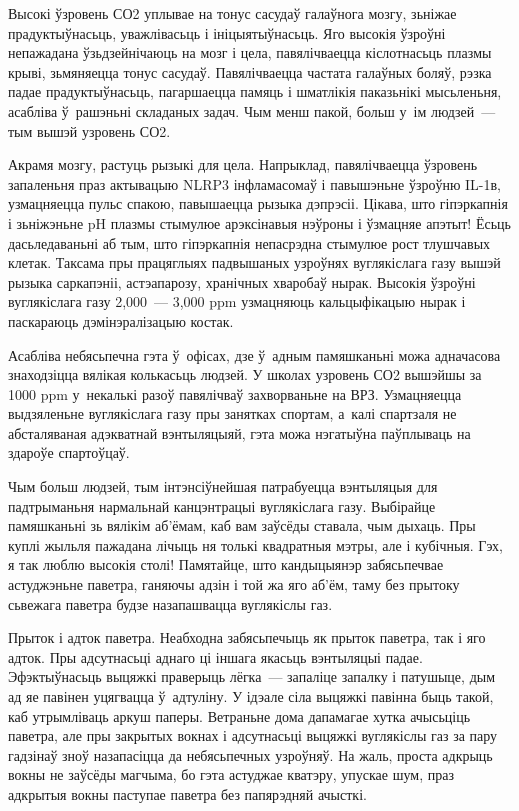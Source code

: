 Высокі ўзровень СО2 уплывае на тонус сасудаў галаўнога мозгу, зьніжае прадуктыўнасьць, уважлівасьць і ініцыятыўнасьць. Яго высокія ўзроўні непажадана ўзьдзейнічаюць на мозг і цела, павялічваецца кіслотнасьць плазмы крыві, зьмяняецца тонус сасудаў. Павялічваецца частата галаўных боляў, рэзка падае прадуктыўнасьць, пагаршаецца памяць і шматлікія паказьнікі мысьленьня, асабліва ў~рашэньні складаных задач. Чым менш пакой, больш у~ім людзей~--- тым вышэй узровень СО2.

Акрамя мозгу, растуць рызыкі для цела. Напрыклад, павялічваецца ўзровень запаленьня праз актывацыю NLRP3 інфламасомаў і павышэньне ўзроўню IL-1в, узмацняецца пульс спакою, павышаецца рызыка дэпрэсіі. Цікава, што гіпэркапнія і зьніжэньне pH плазмы стымулюе арэксінавыя нэўроны і ўзмацняе апэтыт! Ёсьць дасьледаваньні аб тым, што гіпэркапнія непасрэдна стымулюе рост тлушчавых клетак. Таксама пры працяглыях падвышаных узроўнях вуглякіслага газу вышэй рызыка саркапэніі, астэапарозу, хранічных хваробаў нырак. Высокія ўзроўні вуглякіслага газу 2,000~--- 3,000 ppm узмацняюць кальцыфікацыю нырак і паскараюць дэмінэралізацыю костак.

Асабліва небясьпечна гэта ў~офісах, дзе ў~адным памяшканьні можа адначасова знаходзіцца вялікая колькасьць людзей. У школах узровень СО2 вышэйшы за 1000 ppm у~некалькі разоў павялічваў захворваньне на ВРЗ. Узмацняецца выдзяленьне вуглякіслага газу пры занятках спортам, а~калі спартзаля не абсталяваная адэкватнай вэнтыляцыяй, гэта можа нэгатыўна паўплываць на здароўе спартоўцаў.

Чым больш людзей, тым інтэнсіўнейшая патрабуецца вэнтыляцыя для падтрыманьня нармальнай канцэнтрацыі вуглякіслага газу. Выбірайце памяшканьні зь вялікім аб'ёмам, каб вам заўсёды ставала, чым дыхаць. Пры куплі жыльля пажадана лічыць ня толькі квадратныя мэтры, але і кубічныя. Гэх, я так люблю высокія столі! Памятайце, што кандыцыянэр забясьпечвае астуджэньне паветра, ганяючы адзін і той жа яго аб'ём, таму без прытоку сьвежага паветра будзе назапашвацца вуглякіслы газ.

Прыток і адток паветра. Неабходна забясьпечыць як прыток паветра, так і яго адток. Пры адсутнасьці аднаго ці іншага якасьць вэнтыляцыі падае. Эфэктыўнасьць выцяжкі праверыць лёгка~--- запаліце запалку і патушыце, дым ад яе павінен уцягвацца ў~адтуліну. У ідэале сіла выцяжкі павінна быць такой, каб утрымліваць аркуш паперы. Ветраньне дома дапамагае хутка ачысьціць паветра, але пры закрытых вокнах і адсутнасьці выцяжкі вуглякіслы газ за пару гадзінаў зноў назапасіцца да небясьпечных узроўняў. На жаль, проста адкрыць вокны не заўсёды магчыма, бо гэта астуджае кватэру, упускае шум, праз адкрытыя вокны паступае паветра без папярэдняй ачысткі.

